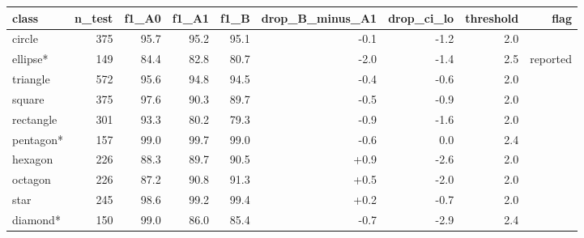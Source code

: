 \begin{tabular}{lrrrrrrrr}
\toprule
class & n\_test & f1\_A0 & f1\_A1 & f1\_B & drop\_B\_minus\_A1 & drop\_ci\_lo & threshold & flag \\
\midrule
circle & 375 & 95.7 & 95.2 & 95.1 & -0.1 & -1.2 & 2.0 &  \\
ellipse* & 149 & 84.4 & 82.8 & 80.7 & -2.0 & -1.4 & 2.5 & reported \\
triangle & 572 & 95.6 & 94.8 & 94.5 & -0.4 & -0.6 & 2.0 &  \\
square & 375 & 97.6 & 90.3 & 89.7 & -0.5 & -0.9 & 2.0 &  \\
rectangle & 301 & 93.3 & 80.2 & 79.3 & -0.9 & -1.6 & 2.0 &  \\
pentagon* & 157 & 99.0 & 99.7 & 99.0 & -0.6 & 0.0 & 2.4 &  \\
hexagon & 226 & 88.3 & 89.7 & 90.5 & +0.9 & -2.6 & 2.0 &  \\
octagon & 226 & 87.2 & 90.8 & 91.3 & +0.5 & -2.0 & 2.0 &  \\
star & 245 & 98.6 & 99.2 & 99.4 & +0.2 & -0.7 & 2.0 &  \\
diamond* & 150 & 99.0 & 86.0 & 85.4 & -0.7 & -2.9 & 2.4 &  \\
\bottomrule
\end{tabular}

